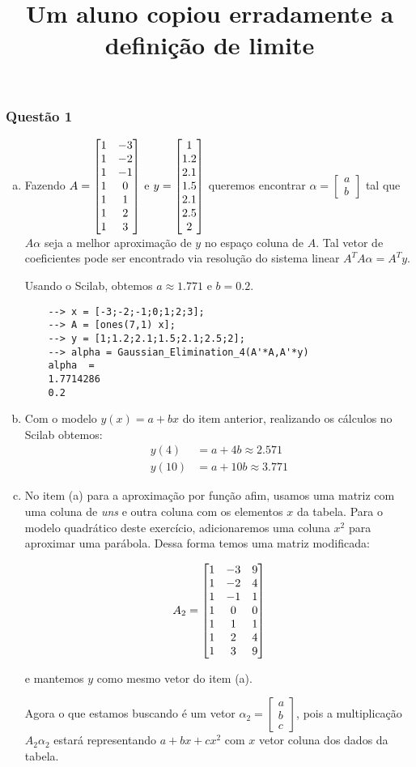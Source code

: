 \documentclass[12pt]{article}
\title{Um aluno copiou erradamente a definição de limite}
\begin{document}
	\subsubsection*{Questão 1}
		\begin{enumerate}[a)]
			\item Fazendo $A=\begin{bmatrix}1&-3\cr 1&-2\cr 1&-1\cr 1&0\cr 1&1\cr 1&2\cr 1&3\cr \end{bmatrix}$ e $y=\begin{bmatrix}1\cr 1.2\cr 2.1\cr 1.5\cr 2.1\cr 2.5\cr 2\cr \end{bmatrix}$ queremos encontrar $\alpha = \begin{bmatrix}a\\b\end{bmatrix}$ tal que $A\alpha$ seja a melhor aproximação de $y$ no espaço coluna de $A$. Tal vetor de coeficientes pode ser encontrado via resolução do sistema linear $A^TA\alpha = A^Ty$.
			
			Usando o Scilab, obtemos $a\approx 1.771$ e $b= 0.2$.
			
			\begin{lstlisting}
	--> x = [-3;-2;-1;0;1;2;3];
	--> A = [ones(7,1) x];
	--> y = [1;1.2;2.1;1.5;2.1;2.5;2];
	--> alpha = Gaussian_Elimination_4(A'*A,A'*y)
	alpha  = 
	1.7714286
	0.2 
			\end{lstlisting}
		
		\item Com o modelo $y(x) = a+bx$ do item anterior, realizando os cálculos no Scilab obtemos:
		\begin{align*}
			y(4) &= a+4b \approx 2.571\\
			y(10) & = a+10b \approx 3.771
		\end{align*}
		
		\item No item (a) para a aproximação por função afim, usamos uma matriz com uma coluna de \textit{uns} e outra coluna com os elementos $x$ da tabela. Para o modelo quadrático deste exercício, adicionaremos uma coluna $x^2$ para aproximar uma parábola. Dessa forma temos uma matriz modificada:
	
	$$A_2=\begin{bmatrix}1&-3&9\cr 1&-2&4\cr 1&-1&1\cr 1&0&0\cr 1&1&1\cr 1&2&4\cr 1&3&9\cr \end{bmatrix}$$
	
	e mantemos $y$ como mesmo vetor do item (a). 
	
	Agora o que estamos buscando é um vetor $\alpha_2=\begin{bmatrix}
		a\\b\\c
	\end{bmatrix}$, pois a multiplicação $A_2\alpha_2$ estará representando $a+bx+cx^2$ com $x$ vetor coluna dos dados da tabela.
	

\end{enumerate}
\end{document}
